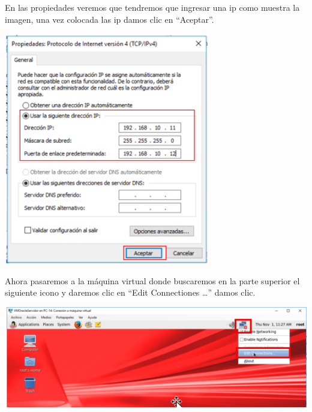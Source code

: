 \newpage

En las propiedades veremos que tendremos que ingresar una ip como muestra la imagen, una vez colocada las ip damos clic en “Aceptar”.  
	\begin{center}
		\includegraphics[width=9cm]{./Imagenes/34} 
	\end{center} 

\vspace{\baselineskip}

Ahora pasaremos a la máquina virtual donde buscaremos en la parte superior el siguiente icono y daremos clic en “Edit Connectiones …” damos clic.
	\begin{center}
		\includegraphics[width=18cm]{./Imagenes/35} 
	\end{center} 

\newpage

